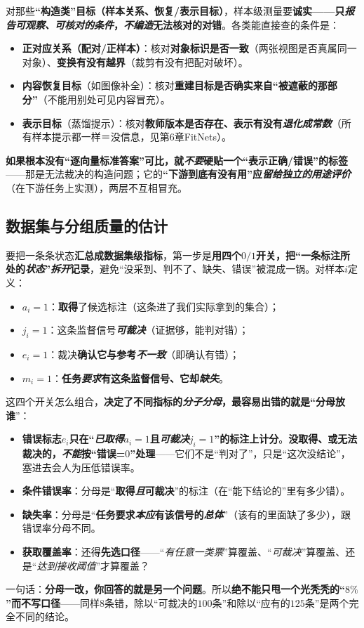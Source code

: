 对那些\textbf{“构造类”目标（样本关系、恢复/表示目标）}，样本级测量要\textbf{诚实——只\emph{报告可观察、可核对的条件}，\emph{不编造}无法核对的对错}。各类能直接查的条件是：
\begin{itemize}\item \textbf{正对应关系（配对/正样本）}：核对\textbf{对象标识是否一致}（两张视图是否真属同一对象）、\textbf{变换有没有越界}（裁剪有没有把配对破坏）。\item \textbf{内容恢复目标}（如图像补全）：核对\textbf{重建目标是否确实来自“被遮蔽的那部分”}（不能用别处可见内容冒充）。\item \textbf{表示目标}（蒸馏提示）：核对\textbf{教师版本是否存在、表示有没有\emph{退化成常数}}（所有样本提示都一样＝没信息，见第6章FitNets）。\end{itemize}
\textbf{如果根本没有“逐向量标准答案”可比，就\emph{不要}硬贴一个“表示正确/错误”的标签}——那是无法裁决的构造问题；它的\textbf{“下游到底有没有用”应\emph{留给独立的用途评价}}（在下游任务上实测），两层不互相冒充。

\subsection{数据集与分组质量的估计}
\label{sec:knowledge-quality-assessment-correction-dataset-estimation}

要把一条条状态\textbf{汇总成数据集级指标}，第一步是\textbf{用四个$0/1$开关，把“一条标注所处的\emph{状态}”\emph{拆开}记录}，避免“没采到、判不了、缺失、错误”被混成一锅。对样本$i$定义：
\begin{itemize}\item $a_i=1$：\textbf{取得}了候选标注（这条进了我们实际拿到的集合）；\item $j_i=1$：这条监督信号\textbf{\emph{可裁决}}（证据够，能判对错）；\item $e_i=1$：裁决\textbf{确认它与参考\emph{不一致}}（即确认有错）；\item $m_i=1$：\textbf{任务\emph{要求}有这条监督信号、它却\emph{缺失}}。\end{itemize}

这四个开关怎么组合，\textbf{决定了不同指标的\emph{分子分母}，最容易出错的就是“分母放谁}”：
\begin{itemize}\item \textbf{错误标志$e_i$只在“\emph{已取得}$a_i=1$\textbf{且}\emph{可裁决}$j_i=1$”的标注上计分}。\textbf{没取得、或无法裁决的，\emph{不能}按“错误=$0$”处理}——它们不是“判对了”，只是“这次没结论”，塞进去会人为压低错误率。\item \textbf{条件错误率}：分母是“\textbf{取得\emph{且}可裁决}”的标注（在“能下结论的”里有多少错）。\item \textbf{缺失率}：分母是“\textbf{任务要求\emph{本应}有该信号的\emph{总体}}”（该有的里面缺了多少），跟错误率分母不同。\item \textbf{获取覆盖率}：还得\textbf{先选口径}——“\emph{有任意一类票}”算覆盖、“\emph{可裁决}”算覆盖、还是“\emph{达到接收阈值}”才算覆盖？\end{itemize}
一句话：\textbf{分母一改，你回答的就是另一个问题}。所以\textbf{绝不能只甩一个光秃秃的“$8\%$”而不写口径}——同样$8$条错，除以“可裁决的$100$条”和除以“应有的$125$条”是两个完全不同的结论。


